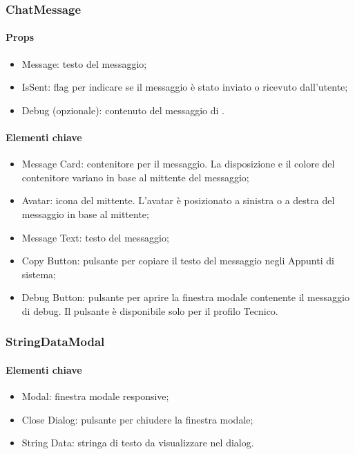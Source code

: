 \subsubsection{ChatMessage}

\paragraph*{Props}
\begin{itemize}
  \item Message: testo del messaggio;
  \item IsSent: flag per indicare se il messaggio è stato inviato o ricevuto dall'utente;
  \item Debug (opzionale): contenuto del messaggio di .
\end{itemize}

\paragraph*{Elementi chiave}
\begin{itemize}
  \item Message Card: contenitore per il messaggio. La disposizione e il colore del contenitore variano in base al mittente del messaggio;
  \item Avatar: icona del mittente. L'avatar è posizionato a sinistra o a destra del messaggio in base al mittente;
  \item Message Text: testo del messaggio;
  \item Copy Button: pulsante per copiare il testo del messaggio negli Appunti di sistema;
  \item Debug Button: pulsante per aprire la finestra modale contenente il messaggio di debug. Il pulsante è disponibile solo per il profilo Tecnico.
\end{itemize}

\subsubsection{StringDataModal}

\paragraph*{Elementi chiave}
\begin{itemize}
  \item Modal: finestra modale responsive;
  \item Close Dialog: pulsante per chiudere la finestra modale;
  \item String Data: stringa di testo da visualizzare nel dialog.
\end{itemize}

